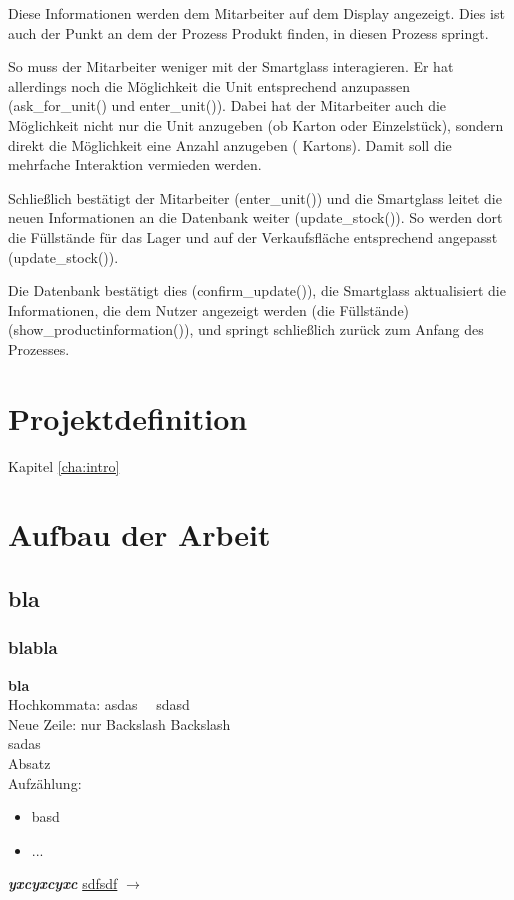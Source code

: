 Diese Informationen werden dem Mitarbeiter auf dem Display angezeigt. Dies ist auch der Punkt an dem der Prozess \glqq Produkt finden\grqq , in diesen Prozess springt.

So muss der Mitarbeiter weniger mit der Smartglass interagieren. Er hat allerdings noch die Möglichkeit die Unit entsprechend anzupassen (ask\_for\_unit() und enter\_unit()). Dabei hat der Mitarbeiter auch die Möglichkeit nicht nur die Unit anzugeben (ob Karton oder Einzelstück), sondern direkt die Möglichkeit eine Anzahl anzugeben ( Kartons). Damit soll die mehrfache Interaktion vermieden werden. 

Schließlich bestätigt der Mitarbeiter (enter\_unit()) und die Smartglass leitet die neuen Informationen an die Datenbank weiter (update\_stock()). So werden dort die Füllstände für das Lager und auf der Verkaufsfläche entsprechend angepasst (update\_stock()).

Die Datenbank bestätigt dies (confirm\_update()), die Smartglass aktualisiert die Informationen, die dem Nutzer angezeigt werden (die Füllstände) (show\_productinformation()), und springt schließlich zurück zum Anfang des Prozesses. 








\section{Projektdefinition}
Kapitel \ref{cha:intro}

\section{Aufbau der Arbeit}
\subsection{bla}
\subsubsection{blabla}
\textbf{bla}\\
Hochkommata: \glqq asdas\grqq~~ sdasd\\

Neue Zeile: nur Backslash Backslash\\
sadas\\

Absatz\\

Aufzählung:
\begin{itemize}
	\item basd
	\item ...
\end{itemize}

\textit{\textbf{yxcyxcyxc}}
\underline{sdfsdf}
$\rightarrow$





